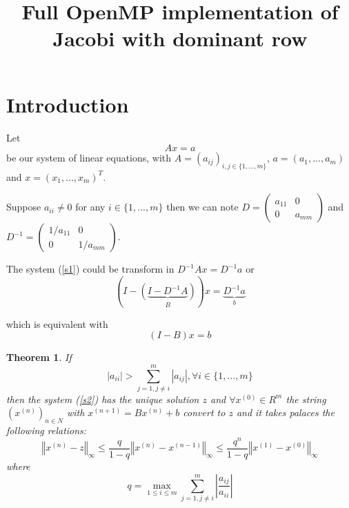\documentclass[a4paper]{article}
\newtheorem{theorem}{Theorem}
\begin{document}
\title{Full OpenMP implementation of Jacobi with dominant row}
\date{}
\author{}
\maketitle

\section{Introduction}

Let 
\begin{equation}
Ax=a  \label{s1}
\end{equation}
be our system of linear equations, with $A=(a_{ij})_{i,j\in \{1,...,m\}}$, $%
a=(a_{1},...,a_{m})$ and $x=(x_{1},...,x_{m})^{T}$.

Suppose $a_{ii}\neq 0$ for any $i\in \{1,...,m\}$ then we can note $D=%
\begin{pmatrix}
a_{11} & 0 \\ 
0 & a_{mm}%
\end{pmatrix}%
$ and $D^{-1}=%
\begin{pmatrix}
1/a_{11} & 0 \\ 
0 & 1/a_{mm}%
\end{pmatrix}%
$.

The system (\ref{s1}) could be transform in $D^{-1}Ax=D^{-1}a$ or%
\begin{equation*}
\left( I-\underset{B}{\left( \underbrace{I-D^{-1}A}\right) }\right) x=%
\underset{b}{\underbrace{D^{-1}a}}
\end{equation*}

which is equivalent with%
\begin{equation}
(I-B)x=b  \label{s2}
\end{equation}

\begin{theorem}
If 
\begin{equation}
\left\vert a_{ii}\right\vert >\sum_{j=1,j\neq i}^{m}\left\vert
a_{ij}\right\vert ,\forall i\in \{1,...,m\}  \label{s3}
\end{equation}%
then the system (\ref{s2}) has the unique solution $z$ and $\forall
x^{(0)}\in R^{m}$ the string $(x^{(n)})_{n\in N}$ with $x^{(n+1)}=Bx^{(n)}+b$
convert to $z$ and it takes palaces the following relations: 
\begin{equation}
\left\Vert x^{(n)}-z\right\Vert _{\infty }\leq \frac{q}{1-q}\left\Vert
x^{(n)}-x^{(n-1)}\right\Vert _{\infty }\leq \frac{q^{n}}{1-q}\left\Vert
x^{(1)}-x^{(0)}\right\Vert _{\infty }  \label{s4}
\end{equation}%
where 
\begin{equation*}
q=\max_{1\leq i\leq m}\sum_{j=1,j\neq i}^{m}\left\vert \frac{a_{ij}}{a_{ii}}%
\right\vert
\end{equation*}
\end{theorem}
\end{document}
